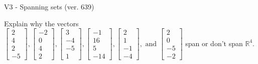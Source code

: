 \begin{exercise}
  \begin{exerciseTitle}V3 - Spanning sets (ver. 639)\end{exerciseTitle}
  \begin{exerciseStatement}
    Explain why the vectors \(\left[\begin{array}{r}
2 \\
4 \\
2 \\
-5
\end{array}\right] , \left[\begin{array}{r}
-2 \\
0 \\
4 \\
2
\end{array}\right] , \left[\begin{array}{r}
3 \\
-4 \\
-5 \\
1
\end{array}\right] , \left[\begin{array}{r}
-1 \\
16 \\
5 \\
-14
\end{array}\right] , \left[\begin{array}{r}
2 \\
1 \\
-1 \\
-4
\end{array}\right] , \text{ and } \left[\begin{array}{r}
2 \\
0 \\
-5 \\
-2
\end{array}\right]\) span or don't span \(\mathbb{R}^4\). 
	



\end{exerciseStatement}
\end{exercise}
